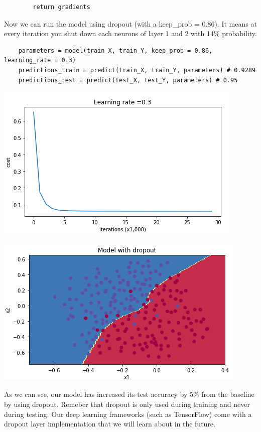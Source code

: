 \documentclass[11pt, a4paper]{article}
\begin{document}
\begin{spacing}{1.1}
\begin{lstlisting}
		return gradients \end{lstlisting} \vspace*{1mm}
	Now we can run the model using dropout (with a keep\_prob = 0.86). It means at every iteration you shut down each neurons of layer 1 and 2 with 14\% probability. 
	\begin{lstlisting}
	parameters = model(train_X, train_Y, keep_prob = 0.86, learning_rate = 0.3)
	predictions_train = predict(train_X, train_Y, parameters) # 0.9289
	predictions_test = predict(test_X, test_Y, parameters) # 0.95 \end{lstlisting}
	\begin{minipage}[c]{9cm}
	\begin{center} \includegraphics[scale=.51]{dropout_cost}	\end{center}
	\end{minipage}
	\begin{minipage}[c]{9cm}
	\begin{center} \includegraphics[scale=.51]{dropout_bound}	\end{center}
	\end{minipage} \vspace*{1.5mm} \newline
	As we can see, our model has increased its test accuracy by 5\% from the baseline by using dropout. Remeber that dropout is only used during training and never during testing. Our deep learning frameworks (such as TensorFlow) come with a dropout layer implementation that we will learn about in the future. \newpage


\end{spacing}
\end{document}
